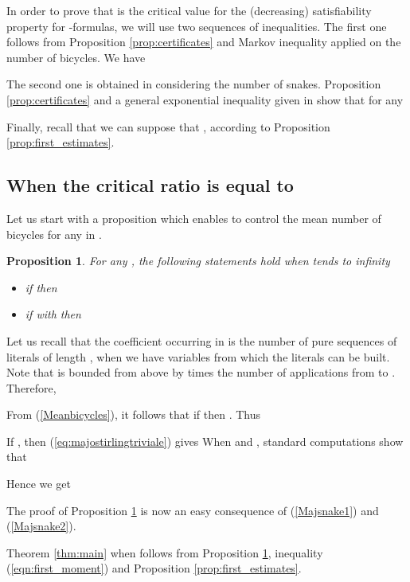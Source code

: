 \documentclass[aop,noinfoline]{imsart}
\newtheorem{proposition}[theorem]{Proposition}
\renewcommand{\Box}{{\vrule width0.6ex height1em depth0cm}}
\newenvironment{proof}{\noindent{\bf Proof:}}{\hfill \Box}
\begin{document}
    
    In order to prove that  is the critical value for the (decreasing) satisfiability  property for  -formulas, we will use  two  sequences of inequalities. The first one follows from    Proposition \ref{prop:certificates} and Markov
inequality applied on the number of bicycles. We have 

The second one is obtained in   considering  the number of snakes. Proposition
\ref{prop:certificates} and  a general exponential inequality given in
\cite[Theorem 2.18  ii)]{JansonLR-00} show that   for any  


Finally,  recall that we can  suppose that , according to  Proposition \ref{prop:first_estimates}. 

\subsection{When the critical ratio is equal to }\label{subsec:c=2}

Let us start with a proposition which enables to control the mean
number of bicycles for any  in .

\begin{proposition}\label{prop:bicyclebound}
 For any , the following statements hold when   tends to  infinity 
\begin{itemize}
\item 
if   then  


\item  if   with  then   
\end{itemize}
\end{proposition}
\begin{proof}
Let us recall that the coefficient  occurring in  is  the number of pure sequences of literals of length
  , when we have    variables from which the literals can be
  built.   Note that  is bounded
from above by  times the number of applications
from  to . Therefore,

From (\ref{Meanbicycles}),  it follows that  if    then  . Thus 

If ,  then (\ref{eq:majostirlingtriviale}) gives  When  and , standard computations show
that

Hence  we get 

The proof  of  Proposition \ref{prop:bicyclebound}  is now an easy consequence of  (\ref{Majsnake1}) and (\ref{Majsnake2}). 
 \end{proof}




 Theorem \ref{thm:main} when  follows from Proposition
 \ref{prop:bicyclebound}, inequality (\ref{eqn:first_moment})  and
 Proposition \ref{prop:first_estimates}.
\end{document}
